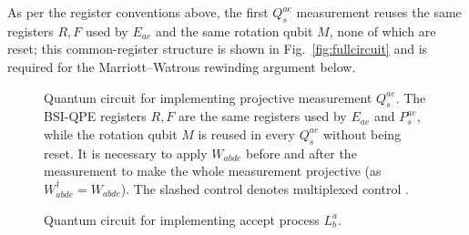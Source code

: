 \documentclass[aps,floatfix,10pt,amssymb,amsfont,amsmath,superscriptaddress,float,nofootinbib,longbibliography,nobalancelastpage,twocolumn]{revtex4-2}
\begin{document}
As per the register conventions above, the first $Q_s^{ae}$ measurement reuses the same registers $R, F$ used by $E_{ae}$ and the same rotation qubit $M$, none of which are reset; this common-register structure is shown in Fig.~\ref{fig:fullcircuit} and is required for the Marriott--Watrous rewinding argument below.
\begin{figure}

\caption{Quantum circuit for implementing projective measurement $Q_s^{ae}$. The BSI-QPE registers $R, F$ are the same registers used by $E_{ae}$ and $P_s^{ae}$, while the rotation qubit $M$ is reused in every $Q_s^{ae}$ without being reset. It is necessary to apply $W_{abde}$ before and after the measurement to make the whole measurement projective (as $W_{abde}^{\dagger}=W_{abde}$). The slashed control denotes multiplexed control \cite{low2024trading}.}
\label{fig:Qcircuit}
\end{figure}

\begin{figure}

\caption{Quantum circuit for implementing accept process $L_b^a$.}
\label{fig:LQ_circuit}
\end{figure}
\end{document}
